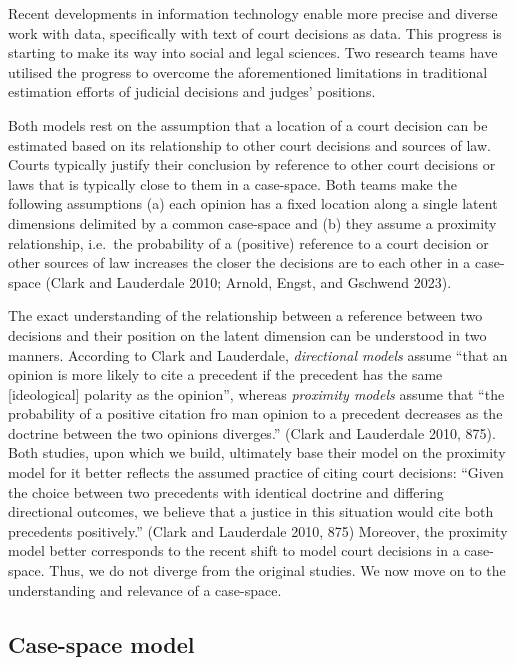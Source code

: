 \documentclass[
  11pt,
]{article}
\begin{document}
Recent developments in information technology enable more precise and
diverse work with data, specifically with text of court decisions as
data. This progress is starting to make its way into social and legal
sciences. Two research teams have utilised the progress to overcome the
aforementioned limitations in traditional estimation efforts of judicial
decisions and judges' positions.

Both models rest on the assumption that a location of a court decision
can be estimated based on its relationship to other court decisions and
sources of law. Courts typically justify their conclusion by reference
to other court decisions or laws that is typically close to them in a
case-space. Both teams make the following assumptions (a) each opinion
has a fixed location along a single latent dimensions delimited by a
common case-space and (b) they assume a proximity relationship, i.e.~the
probability of a (positive) reference to a court decision or other
sources of law increases the closer the decisions are to each other in a
case-space (Clark and Lauderdale 2010; Arnold, Engst, and Gschwend
2023).

The exact understanding of the relationship between a reference between
two decisions and their position on the latent dimension can be
understood in two manners. According to Clark and Lauderdale,
\emph{directional models} assume ``that an opinion is more likely to
cite a precedent if the precedent has the same {[}ideological{]}
polarity as the opinion'', whereas \emph{proximity models} assume that
``the probability of a positive citation fro man opinion to a precedent
decreases as the doctrine between the two opinions diverges.'' (Clark
and Lauderdale 2010, 875). Both studies, upon which we build, ultimately
base their model on the proximity model for it better reflects the
assumed practice of citing court decisions: ``Given the choice between
two precedents with identical doctrine and differing directional
outcomes, we believe that a justice in this situation would cite both
precedents positively.'' (Clark and Lauderdale 2010, 875) Moreover, the
proximity model better corresponds to the recent shift to model court
decisions in a case-space. Thus, we do not diverge from the original
studies. We now move on to the understanding and relevance of a
case-space.

\subsection{Case-space model}\label{case-space-model}
\end{document}
